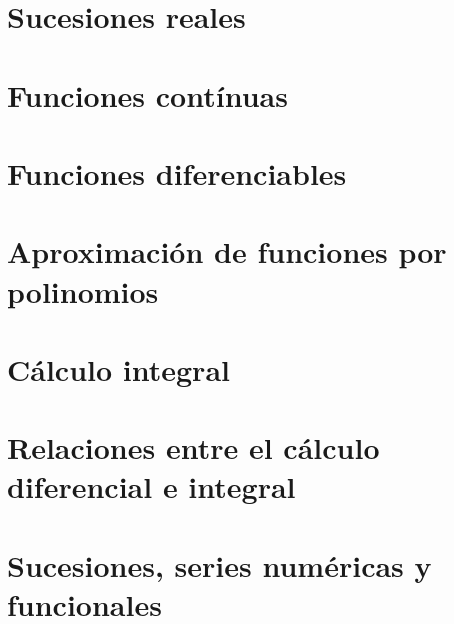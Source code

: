 \chapter{Sucesiones reales}
\chapter{Funciones contínuas}
\chapter{Funciones diferenciables}
\chapter{Aproximación de funciones por polinomios}
\chapter{Cálculo integral}
\chapter{Relaciones entre el cálculo diferencial e integral}
\chapter{Sucesiones, series numéricas y funcionales}



